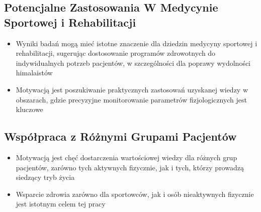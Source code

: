 \subsection{Potencjalne Zastosowania W Medycynie Sportowej i Rehabilitacji}
\begin{itemize}
    \item Wyniki badań mogą mieć istotne znaczenie dla dziedzin medycyny sportowej i rehabilitacji, sugerując dostosowanie programów zdrowotnych do indywidualnych potrzeb pacjentów, w szczególności dla poprawy wydolności himalaistów
    \item Motywacją jest poszukiwanie praktycznych zastosowań uzyskanej wiedzy w obszarach, gdzie precyzyjne monitorowanie parametrów fizjologicznych jest kluczowe
\end{itemize}
\subsection{Współpraca z Różnymi Grupami Pacjentów}
\begin{itemize}
    \item Motywacją jest chęć dostarczenia wartościowej wiedzy dla różnych grup pacjentów, zarówno tych aktywnych fizycznie, jak i tych, którzy prowadzą siedzący tryb życia
    \item Wsparcie zdrowia zarówno dla sportowców, jak i osób nieaktywnych fizycznie jest istotnym celem tej pracy
\end{itemize}